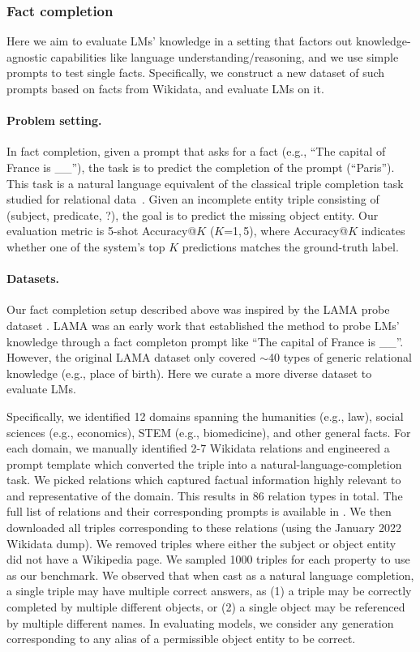 \subsubsection{Fact completion}
\label{sec:knowledge-factCompletion}
Here we aim to evaluate LMs' knowledge in a setting that factors out knowledge-agnostic capabilities like language understanding/reasoning, and we use simple prompts to test single facts. Specifically, we construct a new dataset of such prompts based on facts from Wikidata, and evaluate LMs on it.

\paragraph{Problem setting.}
In fact completion, given a prompt that asks for a fact (e.g., ``The capital of France is \_\_''), the task is to predict the completion of the prompt (``Paris''). This task is a natural language equivalent of the classical triple completion task studied for relational data~\citep{bordes2013translating}. Given an incomplete entity triple consisting of (subject, predicate, ?), the goal is to predict the missing object entity.
Our evaluation metric is 5-shot Accuracy@$K$ ($K$=1,\,5), where Accuracy@$K$ indicates whether one of the system's top $K$ predictions matches the ground-truth label. 

\paragraph{Datasets.} 
Our fact completion setup described above was inspired by the LAMA probe dataset \citep{petroni2019language}.
LAMA was an early work that established the method to probe LMs' knowledge through a fact completon prompt like ``The capital of France is \_\_''.
However, the original LAMA dataset only covered $\sim$40 types of generic relational knowledge (e.g., place of birth). Here we curate a more diverse dataset to evaluate LMs.

Specifically, we identified 12 domains spanning the humanities (e.g., law), social sciences (e.g., economics), STEM (e.g., biomedicine), and other general facts. 
For each domain, we manually identified 2-7 Wikidata relations and engineered a prompt template which converted the triple into a natural-language-completion task. 
We picked relations which captured factual information highly relevant to and representative of the domain. 
This results in 86 relation types in total. 
The full list of relations and their corresponding prompts is available in . 
We then downloaded all triples corresponding to these relations (using the January 2022 Wikidata dump). 
We removed triples where either the subject or object entity did not have a Wikipedia page. 
We sampled 1000 triples for each property to use as our benchmark. 
We observed that when cast as a natural language completion, a single triple may have multiple correct answers, as (1) a triple may be correctly completed by multiple different objects, or (2) a single object may be referenced by multiple different names. 
In evaluating models, we consider any generation corresponding to any alias of a permissible object entity to be correct.

